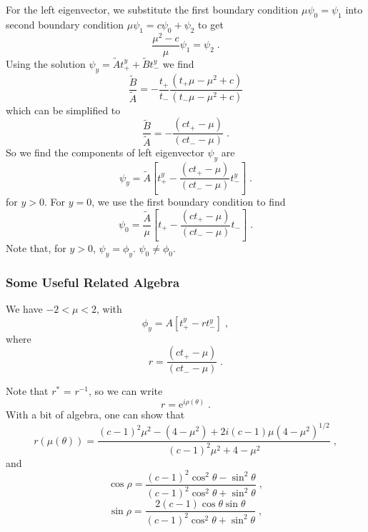 \documentclass[a4paper,10pt]{article}
\begin{document}
For the left eigenvector, we substitute the first boundary condition $\mu\psi_0 = \psi_1$ into second boundary condition $\mu\psi_1 = c\psi_0+\psi_2$ to get
\begin{equation}
  \frac{\mu^2-c}{\mu} \psi_1 = \psi_2 \;.
\end{equation}
Using the solution $\psi_y = \tilde{A} t_+^y + \tilde{B} t_-^y$ we find
\begin{equation}
  \frac{\tilde{B}}{\tilde{A}} = - \frac{t_+}{t_-} \frac{(t_+\mu-\mu^2+c)}{(t_-\mu-\mu^2+c)}
\end{equation}
which can be simplified to 
\begin{equation}
  \frac{\tilde{B}}{\tilde{A}} = - \frac{(c t_+ - \mu)}{(ct_- - \mu )}\;.
\end{equation}
So we find the components of left eigenvector $\psi_y$ are
\begin{equation}
  \psi_y = \tilde{A} \left[ t_+^y - \frac{(c t_+ - \mu)}{(ct_- - \mu )} t_-^y \right] \;.
\end{equation}
for $y>0$. For $y=0$, we use the first boundary condition to find
\begin{equation}
  \psi_0 = \frac{\tilde{A}}{\mu} \left[ t_+ - \frac{(ct_+-\mu)}{(ct_--\mu)} t_- \right] \;.
\end{equation}
Note that, for $y>0$, $\psi_y = \phi_y$. $\psi_0 \ne \phi_0$.

\subsubsection{Some Useful Related Algebra}

We have $-2< \mu < 2$, with 
\begin{equation}
  \phi_y = A \left[ t_+^y - r t_-^y \right] \;,
\end{equation}
where
\begin{equation}
  r = \frac{(ct_+ - \mu)}{ (ct_- - \mu)} \;.
\end{equation}

Note that $r^*$ = $r^{-1}$, so we can write
\begin{equation}
  r = \mathrm{e}^{i\rho(\theta)} \;.
\end{equation}
With a bit of algebra, one can show that
\begin{equation}
  r(\mu(\theta)) = \frac{ (c-1)^2\mu^2 - (4-\mu^2) + 2i(c-1)\mu(4-\mu^2)^{1/2} }{ (c-1)^2\mu^2 + 4 - \mu^2 } \;, 
\end{equation}
and
\begin{equation}
  \cos\rho = \frac{ (c-1)^2 \cos^2 \theta - \sin^2\theta }{(c-1)^2 \cos^2 \theta + \sin^2\theta } \;, 
\end{equation}
\begin{equation}
  \sin\rho = \frac{ 2(c-1) \cos\theta\sin\theta }{(c-1)^2 \cos^2 \theta + \sin^2\theta } \;, 
\end{equation}
\end{document}
